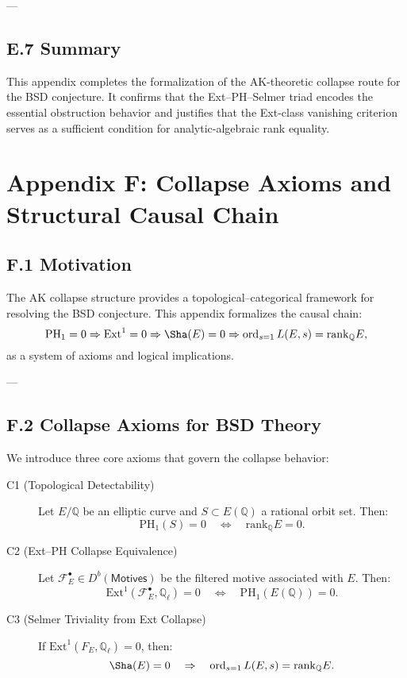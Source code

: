 ---

\subsection*{E.7 Summary}

This appendix completes the formalization of the AK-theoretic collapse route for the BSD conjecture.  
It confirms that the Ext--PH--Selmer triad encodes the essential obstruction behavior and justifies  
that the Ext-class vanishing criterion serves as a sufficient condition for analytic-algebraic rank equality.



\section*{Appendix F: Collapse Axioms and Structural Causal Chain}

\subsection*{F.1 Motivation}

The AK collapse structure provides a topological–categorical framework for resolving the BSD conjecture.  
This appendix formalizes the causal chain:
\[
\mathrm{PH}_1 = 0 \Rightarrow \mathrm{Ext}^1 = 0 \Rightarrow \Sha(E) = 0 \Rightarrow \operatorname{ord}_{s=1}L(E,s) = \mathrm{rank}_{\mathbb{Q}}E,
\]
as a system of axioms and logical implications.

---

\subsection*{F.2 Collapse Axioms for BSD Theory}

We introduce three core axioms that govern the collapse behavior:

\begin{description}
  \item[C1 (Topological Detectability)]  
  Let \( E/\mathbb{Q} \) be an elliptic curve and \( S \subset E(\mathbb{Q}) \) a rational orbit set.  
  Then:
  \[
  \mathrm{PH}_1(S) = 0 \quad \Leftrightarrow \quad \mathrm{rank}_{\mathbb{Q}}E = 0.
  \]

  \item[C2 (Ext–PH Collapse Equivalence)]  
  Let \( \mathcal{F}_E^\bullet \in D^b(\mathsf{Motives}) \) be the filtered motive associated with \( E \).  
  Then:
  \[
  \mathrm{Ext}^1(\mathcal{F}_E^\bullet, \mathbb{Q}_\ell) = 0 \quad \Leftrightarrow \quad \mathrm{PH}_1(E(\mathbb{Q})) = 0.
  \]

  \item[C3 (Selmer Triviality from Ext Collapse)]  
  If \( \mathrm{Ext}^1(F_E, \mathbb{Q}_\ell) = 0 \), then:
  \[
  \Sha(E) = 0 \quad \Rightarrow \quad \operatorname{ord}_{s=1}L(E,s) = \mathrm{rank}_{\mathbb{Q}}E.
  \]
\end{description}

